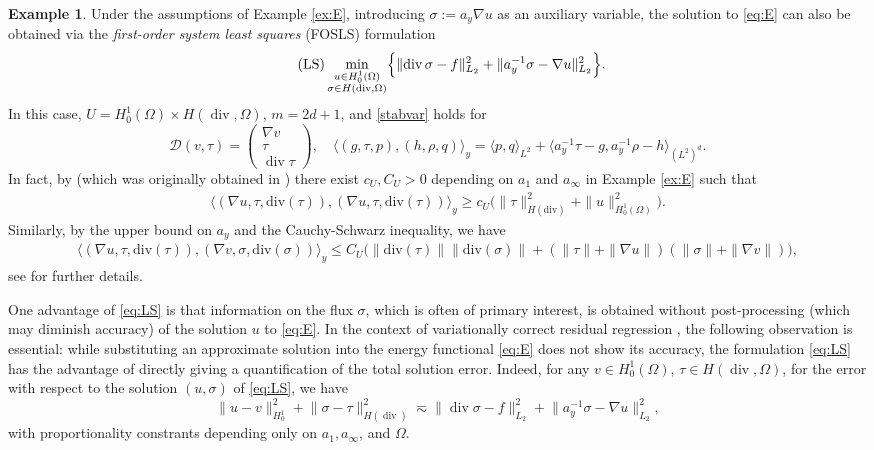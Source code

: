 \documentclass[a4paper,11pt]{amsart}
\DeclareMathOperator*{\Div}{div}
\providecommand{\norm}[1]{\lVert#1\rVert}
\numberwithin{equation}{section}
\theoremstyle{definition}
\newtheorem{example}[theorem]{Example}
\theoremstyle{remark}
\theoremstyle{plain}
\begin{document}
\begin{example}
\label{ex:LS}
Under the assumptions of Example \ref{ex:E}, introducing $\sigma := a_y\nabla u$ as an auxiliary variable, the solution to \eqref{eq:E}
can also be obtained via the
{\em first-order system least squares} (FOSLS) formulation 
\begin{equation}\tag{LS}\label{eq:LS}
  \min_{ \substack{ u \in H^1_0(\Omega)  \\ \sigma \in H(\Div,\Omega) }} \Bigl\{  \norm{ \Div \sigma - f }_{L_2}^2 + \norm{a_y^{-1} \sigma - \nabla u }_{L_2}^2 \Bigr\}.
\end{equation}
In this case, $U = H^1_0(\Omega) \times H(\Div,\Omega)$,  $m=2d+1$, and \eqref{stabvar} holds for 
\[
  \mathcal D (v, \tau) = \begin{pmatrix}  \nabla v  \\ \tau \\ \Div \tau \end{pmatrix}, \quad 
    \bigl\langle (g, \tau, p) , (h, \rho, q)   \bigr\rangle_y  = \langle  p, q  \rangle_{L^2} + \langle a_y^{-1} \tau - g,  a_y^{-1} \rho - h \rangle_{(L^2)^d}.
\]
In fact,
 by \cite[Thm.~5.15]{MR2490235} (which was originally obtained in \cite{FOSL}) there exist $c_U,C_U>0$ depending on $a_1$ and $a_\infty$ in Example \ref{ex:E} such that 
\begin{align*}
	\bigl\langle (\nabla u, \tau,\mathrm{div}(\tau)),(\nabla u, \tau,\mathrm{div}(\tau))\bigr\rangle_y  \geq  c_U \bigl(\|\tau\|_{H(\mathrm{div})}^{2}+\|u\|_{H^1_0(\Omega)}^{2} \bigr).
\end{align*}
Similarly, by the upper bound on $a_y$ and the Cauchy-Schwarz inequality, we have 
\begin{align*}
	\bigl\langle (\nabla u,\tau,\mathrm{div}(\tau)),(\nabla v,\sigma,\mathrm{div}(\sigma))\bigr \rangle_y \leq C_{U}\bigl( \|\mathrm{div}(\tau)\|\|\mathrm{div}(\sigma)\|+(\|\tau\|+\|\nabla u\|)(\|\sigma\|+\|\nabla v\|) \bigr),
\end{align*}
see  \cite{MR2490235,FOSL,BachmayrDahmenOster2024} for further details.
\end{example}

One advantage of \eqref{eq:LS} is that information on the flux $\sigma$, which is often of primary interest, is obtained without post-processing (which may diminish accuracy) of the solution $u$ to \eqref{eq:E}. In the context of variationally correct residual regression \cite{BachmayrDahmenOster2024}, the following observation is essential:
while substituting an approximate solution into the energy functional \eqref{eq:E}
does not show its accuracy, the formulation \eqref{eq:LS} has the advantage of directly giving a quantification of the total solution error. Indeed, for any $v \in H^1_0(\Omega)$, $\tau \in H(\operatorname{div},\Omega)$, for the error with respect to the solution $(u,\sigma)$ of \eqref{eq:LS}, we have
\begin{equation}\label{eq:LSreserr}
   \norm{ u - v }_{H^1_0}^2 + \norm{ \sigma - \tau }_{ H(\operatorname{div}) }^2  
     \eqsim \norm{ \Div \sigma - f }_{L_2}^2 + \norm{a_y^{-1} \sigma - \nabla u }_{L_2}^2 ,
\end{equation}
with proportionality constrants depending only on $a_1,a_\infty$, and $\Omega$.
\end{document}
